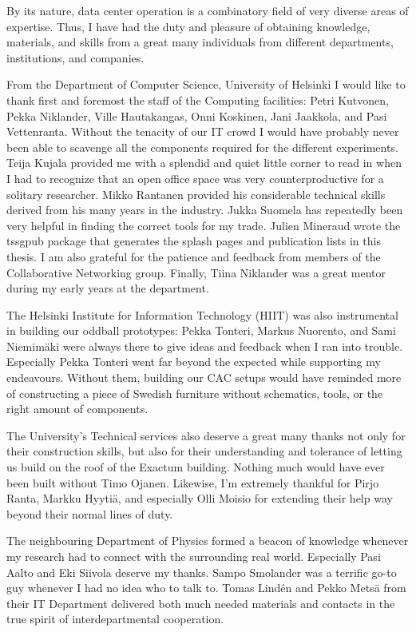 By its nature, data center operation is a combinatory field of very diverse
areas of expertise. Thus, I have had the duty and pleasure of obtaining
knowledge, materials, and skills from a great many individuals from different
departments, institutions, and companies.

From the Department of Computer Science, University of Helsinki I would like
to thank first and foremost the staff of the Computing facilities: Petri
Kutvonen, Pekka Niklander, Ville Hautakangas, Onni Koskinen, Jani Jaakkola,
and Pasi Vettenranta. Without the tenacity of our IT crowd I would have
probably never been able to scavenge all the components required for the
different experiments. Teija Kujala provided me with a splendid and quiet
little corner to read in when I had to recognize that an open office space was
very counterproductive for a solitary researcher. Mikko Rantanen provided his
considerable technical skills derived from his many years in the industry.
Jukka Suomela has repeatedly been very helpful in finding the correct tools
for my trade. Julien Mineraud wrote the tssgpub package that generates the
splash pages and publication lists in this thesis. I am also grateful for the
patience and feedback from members of the Collaborative Networking group.
Finally, Tiina Niklander was a great mentor during my early years at the
department.

The Helsinki Institute for Information Technology (HIIT) was also instrumental
in building our oddball prototypes: Pekka Tonteri, Markus Nuorento, and Sami
Niemimäki were always there to give ideas and feedback when I ran into
trouble. Especially Pekka Tonteri went far beyond the expected while
supporting my endeavours. Without them, building our CAC setups would have
reminded more of constructing a piece of Swedish furniture without schematics,
tools, or the right amount of components.

The University's Technical services also deserve a great many thanks not only
for their construction skills, but also for their understanding and tolerance
of letting us build on the roof of the Exactum building. Nothing much would
have ever been built without Timo Ojanen. Likewise, I'm extremely thankful for
Pirjo Ranta, Markku Hyytiä, and especially Olli Moisio for extending their
help way beyond their normal lines of duty.

The neighbouring Department of Physics formed a beacon of knowledge whenever
my research had to connect with the surrounding real world. Especially Pasi
Aalto and Eki Siivola deserve my thanks. Sampo Smolander was a terrific go-to
guy whenever I had no idea who to talk to. Tomas Lindén and Pekko Metsä from
their IT Department delivered both much needed materials and contacts in the
true spirit of interdepartmental cooperation.

